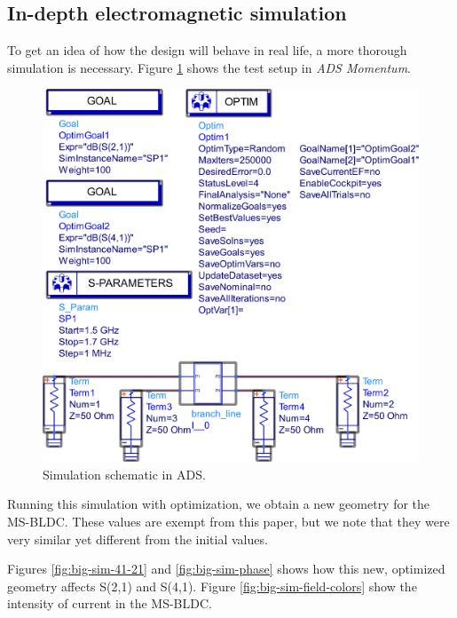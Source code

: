 \subsection{In-depth electromagnetic simulation}

To get an idea of how the design will behave in real life, a more thorough simulation is necessary.
Figure \ref{fig:big-sim} shows the test setup in \emph{ADS Momentum}.

\begin{figure}[h t b p]
	\centering
	\includegraphics[width=\textwidth,keepaspectratio]{figures/big_sim_sch.eps}
	\caption{Simulation schematic in ADS.}
	\label{fig:big-sim}
\end{figure}

Running this simulation with optimization, we obtain a new geometry for the MS-BLDC.
These values are exempt from this paper, but we note that they were very similar yet different from the initial values. \par

Figures \ref{fig:big-sim-41-21} and \ref{fig:big-sim-phase} shows how this new, optimized geometry affects S(2,1) and S(4,1).
Figure \ref{fig:big-sim-field-colors} show the intensity of current in the MS-BLDC.

